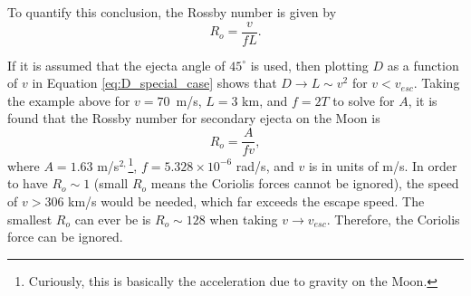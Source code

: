 \documentclass{article}
\begin{document}
To quantify this conclusion, the Rossby number is given by
\begin{equation}
R_o = \frac{v}{fL}.
\end{equation}

If it is assumed that the ejecta angle of $45^\circ$ is used, then plotting $D$ as a function of $v$ in Equation \eqref{eq:D_special_case} shows that $D \rightarrow L\sim v^2$ for $v<v_{esc}$. Taking the example above for $v=70$~m/s, $L = 3$ km, and $f = 2T$ to solve for $A$, it is found that the Rossby number for secondary ejecta on the Moon is
\begin{equation}
R_o = \frac{A}{fv},
\end{equation}
where $A = 1.63$ m/s$^{2,}$\footnote{Curiously, this is basically the acceleration due to gravity on the Moon.}, $f = 5.328\times 10^{-6}$ rad/s, and $v$ is in units of m/s. In order to have $R_o\sim 1$ (small $R_o$ means the Coriolis forces cannot be ignored), the speed of $v > 306$ km/s would be needed, which far exceeds the escape speed. The smallest $R_o$ can ever be is $R_o \sim 128$ when taking $v\to v_{esc}$. Therefore, the Coriolis force can be ignored.
\end{document}
